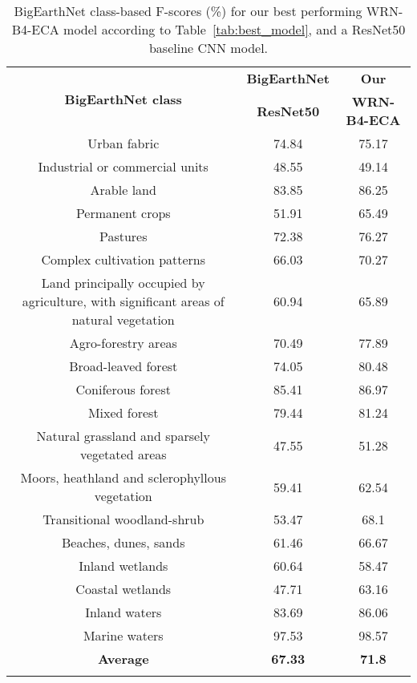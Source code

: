 \documentclass[journal]{IEEEtran}
\begin{document}
\begin{table}[]
    \centering
    \begin{tabular}{ c c c }
    \toprule
    \multirow{2}{*}{\textbf{BigEarthNet class}} & \textbf{BigEarthNet} & \textbf{Our} \\
    & \textbf{ResNet50} & \textbf{WRN-B4-ECA} \\
        \hline
       Urban fabric & 74.84 & 75.17 \\
        \hline
        \parbox{3.5 cm}{\centering Industrial or commercial units} & 48.55 & 49.14 \\
        \hline
        Arable land & 83.85 & 86.25 \\
        \hline
        Permanent crops & 51.91 & 65.49 \\
        \hline
        Pastures & 72.38 & 76.27 \\
        \hline
         \parbox{3.5 cm}{\centering Complex cultivation patterns} & 66.03 & 70.27 \\
        \hline
        \parbox{3.5 cm}{\centering Land principally occupied by agriculture, with significant areas of natural vegetation} & 60.94 & 65.89 \\
        \hline
        Agro-forestry areas & 70.49 & 77.89 \\
        \hline
         Broad-leaved forest & 74.05 & 80.48 \\
        \hline
         Coniferous forest & 85.41 & 86.97 \\
        \hline
         Mixed forest & 79.44 & 81.24 \\
        \hline
         \parbox{3.5 cm}{\centering Natural grassland and sparsely vegetated areas} & 47.55 & 51.28 \\
        \hline
        \parbox{3.5 cm}{\centering Moors, heathland and sclerophyllous vegetation} & 59.41 & 62.54 \\
        \hline
         \parbox{3.5 cm}{\centering Transitional woodland-shrub} & 53.47 & 68.1 \\
        \hline
         Beaches, dunes, sands & 61.46 & 66.67 \\
        \hline
         Inland wetlands & 60.64 & 58.47 \\
        \hline
         Coastal wetlands & 47.71 & 63.16 \\
        \hline
         Inland waters & 83.69 & 86.06 \\
        \hline
         Marine waters & 97.53 & 98.57 \\
        \hline
        \textbf{Average} & \textbf{67.33} & \textbf{71.8} \\
        \hline
        \bottomrule\\
    \end{tabular}
    \caption{BigEarthNet class-based F-scores (\%) for our best performing WRN-B4-ECA model according to Table~\ref{tab:best_model}, and a ResNet50 baseline CNN model.}
    \label{tab:19classes}
\end{table}
\end{document}
